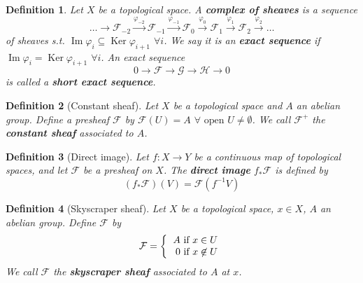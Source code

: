 \documentclass[a4paper]{article}
\newtheorem*{definition}{Definition}
\DeclareMathOperator{\Ima}{Im}
\DeclareMathOperator{\Ker}{Ker}
\begin{document}
\begin{definition}
	Let $X$ be a topological space. A \textbf{complex of sheaves} is a sequence
	$$\dots \to \mathcal{F}_{-2} \overset{\varphi_{-2}}{\to} \mathcal{F}_{-1} \overset{\varphi_{-1}}{\to} \mathcal{F}_0 \overset{\varphi_0}{\to} \mathcal{F}_1 \overset{\varphi_1}{\to} \mathcal{F}_2 \overset{\varphi_2}{\to} \dots$$
	of sheaves s.t. $\Ima \varphi_i \subseteq \Ker \varphi_{i+1}$ $\forall i$. We say it is an \textbf{exact sequence} if $\Ima \varphi_i = \Ker\varphi_{i+1}$ $\forall i$. An exact sequence
	$$0 \to \mathcal{F} \to \mathcal{G} \to \mathcal{H} \to 0$$
	is called a \textbf{short exact sequence}.
\end{definition}

\begin{definition}[Constant sheaf]
	Let $X$ be a topological space and $A$ an abelian group. Define a presheaf $\mathcal{F}$ by $\mathcal{F}(U)=A$ $\forall \text{ open } U \neq \emptyset$. We call $\mathcal{F}^+$ the \textbf{constant sheaf} associated to $A$.
\end{definition}

\begin{definition}[Direct image]
	Let $f:X\to Y$ be a continuous map of topological spaces, and let $\mathcal{F}$ be a presheaf on $X$. The \textbf{direct image} $f_*\mathcal{F}$ is defined by $$(f_*\mathcal{F})(V) = \mathcal{F}(f^{-1}V)$$
\end{definition}

\begin{definition}[Skyscraper sheaf]
	Let $X$ be a topological space, $x \in X$, $A$ an abelian group. Define $\mathcal{F}$ by \[\mathcal{F} = \left\{
	\begin{tabular}{r}
	$A$ if $x \in U$\\$0$ if $x \not\in U$
	\end{tabular}\right.
	\]
	We call $\mathcal{F}$ the \textbf{skyscraper sheaf} associated to $A$ at $x$.
\end{definition}
\end{document}
